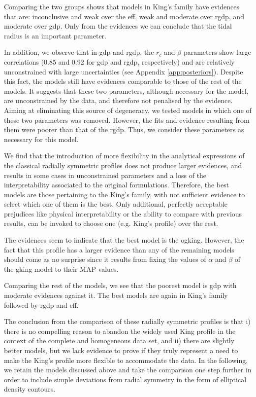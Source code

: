 Comparing the two groups shows that models in King's family have evidences that are: inconclusive and weak
over the \gls{eff}, weak and moderate over  \gls{rgdp}, and moderate over \gls{gdp}. Only from the evidences we can conclude that
the tidal radius is an important parameter.

In addition, we observe that in \gls{gdp} and \gls{rgdp}, the $r_c$ and $\beta$ parameters  show large correlations (0.85 and 0.92 for \gls{gdp} and \gls{rgdp}, respectively) and are relatively unconstrained with large uncertainties (see Appendix \ref{app:posteriors}).
Despite this fact, the models still have evidences comparable to those of the rest of the models. It suggests that these two parameters, although necessary for the model, are unconstrained by the data, and therefore not penalised by the evidence. Aiming at eliminating this source of degeneracy,
 we tested models in which one of these two parameters was removed. However, the fits and evidence resulting from
them were poorer than that of the \gls{rgdp}. Thus, we consider these parameters as necessary for this model.

We find that the introduction of more flexibility in the
analytical expressions of the classical radially symmetric profiles
does not produce larger evidences, and results in some cases in
unconstrained parameters and a loss of the interpretability associated
to the original formulations. Therefore, the best models are those pertaining to the King's family,
with not sufficient evidence to select which one of them is the best. Only
additional, perfectly acceptable prejudices like physical
interpretability or the ability to compare with previous results, can
be invoked to choose one (e.g. King's profile) over the rest.

The evidences seem 
to indicate that the best model is the \gls{ogking}.  
However, the fact that this profile has a larger evidence than any of the
remaining models should come as no surprise since it results from fixing
the values of $\alpha$ and $\beta$ of the \gls{gking} model to their MAP 
values. 

Comparing the rest of the models, we see that the poorest model is \gls{gdp} with moderate evidences against it. 
The best models are again in King's family followed by \gls{rgdp} and \gls{eff}.

The conclusion from the comparison of these radially symmetric
profiles is that i) there is no
compelling reason to abandon the widely used King profile in the
context of the complete and homogeneous data set,
and ii) there are slightly better models, but we lack evidence to prove if they truly 
represent a need to make the King's
profile more flexible to accommodate the data. 
In the following, we retain the models discussed above and
take the comparison one step further in order to include simple
deviations from radial symmetry in the form of elliptical density
contours.

